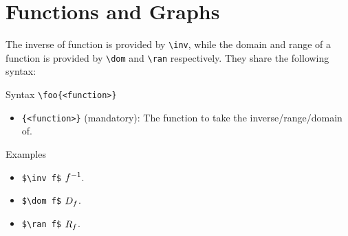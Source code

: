 \section{Functions and Graphs}

The inverse of function is provided by \verb|\inv|, while the domain and range of a function is provided by \verb|\dom| and \verb|\ran| respectively. They share the following syntax:

\begin{myframe}{Syntax}
    \verb|\foo{<function>}|
    \begin{itemize}
        \item \verb|{<function>}| (mandatory): The function to take the inverse/range/domain of.
    \end{itemize}
\end{myframe}

\begin{myframe}{Examples}
    \begin{itemize}
        \item \verb|$\inv f$| \produces{} $f^{-1}$.
        \item \verb|$\dom f$| \produces{} $D_{f}$.
        \item \verb|$\ran f$| \produces{} $R_{f}$.
    \end{itemize}
\end{myframe}